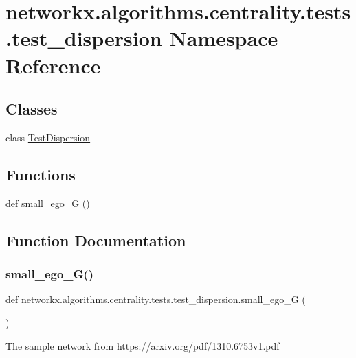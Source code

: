 \hypertarget{namespacenetworkx_1_1algorithms_1_1centrality_1_1tests_1_1test__dispersion}{}\section{networkx.\+algorithms.\+centrality.\+tests.\+test\+\_\+dispersion Namespace Reference}
\label{namespacenetworkx_1_1algorithms_1_1centrality_1_1tests_1_1test__dispersion}
\subsection*{Classes}
\begin{DoxyCompactItemize}
\item 
class \hyperlink{classnetworkx_1_1algorithms_1_1centrality_1_1tests_1_1test__dispersion_1_1TestDispersion}{Test\+Dispersion}
\end{DoxyCompactItemize}
\subsection*{Functions}
\begin{DoxyCompactItemize}
\item 
def \hyperlink{namespacenetworkx_1_1algorithms_1_1centrality_1_1tests_1_1test__dispersion_a82f21a772ad2f55f59ef63a135a7a4fa}{small\+\_\+ego\+\_\+G} ()
\end{DoxyCompactItemize}


\subsection{Function Documentation}
\mbox{\label{namespacenetworkx_1_1algorithms_1_1centrality_1_1tests_1_1test__dispersion_a82f21a772ad2f55f59ef63a135a7a4fa}} 
\subsubsection{\texorpdfstring{small\+\_\+ego\+\_\+\+G()}{small\_ego\_G()}}
{\footnotesize\ttfamily def networkx.\+algorithms.\+centrality.\+tests.\+test\+\_\+dispersion.\+small\+\_\+ego\+\_\+G (\begin{DoxyParamCaption}{ }\end{DoxyParamCaption})}

\begin{DoxyVerb}The sample network from https://arxiv.org/pdf/1310.6753v1.pdf\end{DoxyVerb}
 